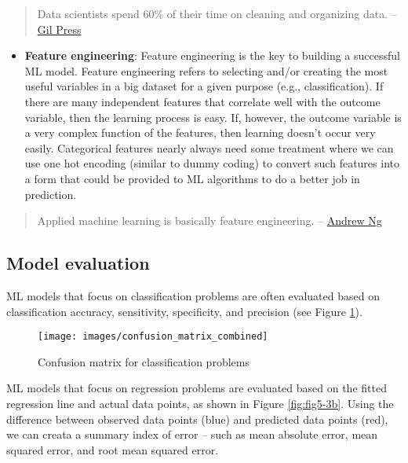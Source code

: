\documentclass[]{book}
\providecommand{\tightlist}{%
  \setlength{\itemsep}{0pt}\setlength{\parskip}{0pt}}
\begin{document}
\begin{quote}
Data scientists spend 60\% of their time on cleaning and organizing data. -- \href{https://www.forbes.com/sites/gilpress/2016/03/23/data-preparation-most-time-consuming-least-enjoyable-data-science-task-survey-says/\#7dfde9af6f63}{Gil Press}
\end{quote}

\begin{itemize}
\tightlist
\item
  \textbf{Feature engineering}: Feature engineering is the key to building a successful ML model. Feature engineering refers to selecting and/or creating the most useful variables in a big dataset for a given purpose (e.g., classification). If there are many independent features that correlate well with the outcome variable, then the learning process is easy. If, however, the outcome variable is a very complex function of the features, then learning doesn't occur very easily. Categorical features nearly always need some treatment where we can use one hot encoding (similar to dummy coding) to convert such features into a form that could be provided to ML algorithms to do a better job in prediction.
\end{itemize}

\begin{quote}
Applied machine learning is basically feature engineering. -- \href{https://en.wikipedia.org/wiki/Andrew_Ng}{Andrew Ng}
\end{quote}

\hypertarget{model-evaluation}{%
\subsection{Model evaluation}\label{model-evaluation}}

ML models that focus on classification problems are often evaluated based on classification accuracy, sensitivity, specificity, and precision (see Figure \ref{fig:fig5-3a}).

\begin{figure}
\texttt{[image: images/confusion\_matrix\_combined]} \caption{Confusion matrix for classification problems}\label{fig:fig5-3a}
\end{figure}

ML models that focus on regression problems are evaluated based on the fitted regression line and actual data points, as shown in Figure \ref{fig:fig5-3b}. Using the difference between observed data points (blue) and predicted data points (red), we can creata a summary index of error -- such as mean absolute error, mean squared error, and root mean squared error.
\end{document}
